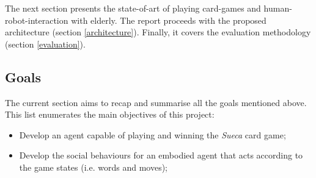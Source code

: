 
The next section presents the state-of-art of playing card-games and human-robot-interaction with elderly.
The report proceeds with the proposed architecture (section \ref{architecture}).
Finally, it covers the evaluation methodology (section \ref{evaluation}). 


\subsection{Goals}
\label{sec:goals}

The current section aims to recap and summarise all the goals mentioned above.
This list enumerates the main objectives of this project:
\begin{itemize}
\item Develop an agent capable of playing and winning the \emph{Sueca} card game;
\item Develop the social behaviours for an embodied agent that acts according to the game states (i.e. words and moves);
\end{itemize}
